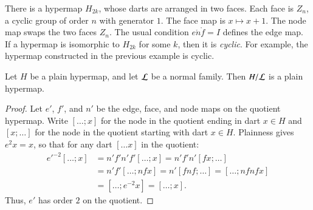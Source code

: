 \begin{example}[cyclic]\label{ex:H2k} 
There is a hypermap $H_{2k}$, whose darts are arranged in two faces.  Each
face is $Z_n$, a cyclic group of order $n$ with generator $1$.
The face map is $x\mapsto x+1$.
The node map swaps the two faces $Z_n$.
The usual condition $e\ocirc n\ocirc f = I$ defines the edge map.
If a hypermap is isomorphic to $H_{2k}$ for
some $k$, then it is {\it cyclic}.  For example,
the hypermap constructed in the previous example is cyclic.
\end{example}

\begin{lemma}
Let $H$ be a plain hypermap, and let $\cal L$ be a
normal family.  Then $H/{\cal L}$ is a plain hypermap.
\end{lemma}

\begin{proof} Let $e'$, $f'$, and $n'$ be the edge, face, and node maps on the
quotient hypermap.  Write $[\ldots; x]$ for the node in the quotient
ending in dart $x\in H$ and $[x;\ldots]$ for the node in the quotient
starting with dart $x\in H$.  Plainness gives $e^2 x = x$, so that for any
dart $[\ldots x]$ in the quotient:
    $$\begin{array}{lll}
    {e'}^{-2} [\ldots; x] &= n' f' n' f' [\ldots; x] = n' f' n' [f x; \ldots] \\&=
    n' f' [\ldots; n f x] = n' [f n f; \ldots] = [\ldots; n f n f x]\\ &=
    [\ldots; e^{-2} x] = [\ldots; x].
    \end{array}$$
Thus, $e'$ has order $2$ on the quotient.
\end{proof}

%


